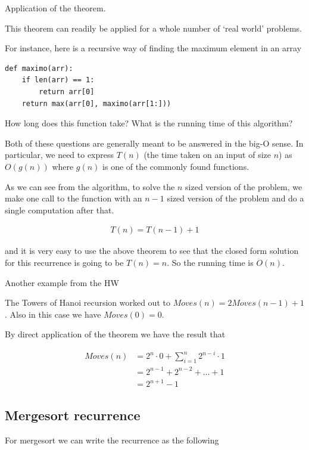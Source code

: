 \documentclass[12pt]{article}
\begin{document}
Application of the theorem.

This theorem can readily be applied for a whole number of `real world' problems.

For instance, here is a recursive way of finding the maximum element in an array

\begin{verbatim}
def maximo(arr):
    if len(arr) == 1:
        return arr[0]
    return max(arr[0], maximo(arr[1:]))
\end{verbatim}

How long does this function take? What is the running time of this algorithm? 

Both of these questions are generally meant to be answered in the big-O sense. In particular, we need to express $T(n)$ (the time taken on an input of size $n$) as $O(g(n))$ where $g(n)$ is one of the commonly found functions.

As we can see from the algorithm, to solve the $n$ sized version of the problem, we make one call to the function with an $n-1$ sized version of the problem and do a single computation after that.

\begin{align*}
T(n) = T(n-1) + 1
\end{align*}

and it is very easy to use the above theorem to see that the closed form solution for this recurrence is going to be $T(n) = n$. So the running time is $O(n)$.

\medskip

Another example from the HW

The Towers of Hanoi recursion worked out to $Moves(n) = 2Moves(n-1) + 1$. Also in this case we have $Moves(0) = 0$.

By direct application of the theorem we have the result that

\begin{align*}
Moves(n) &= 2^n \cdot 0+ \sum_{i=1}^n 2^{n-i} \cdot 1 \\
&=  2^{n-1} + 2^{n-2} + \ldots + 1 \\
&= 2^{n+1} - 1
\end{align*}

\subsection*{Mergesort recurrence}

For mergesort we can write the recurrence as the following
\end{document}
